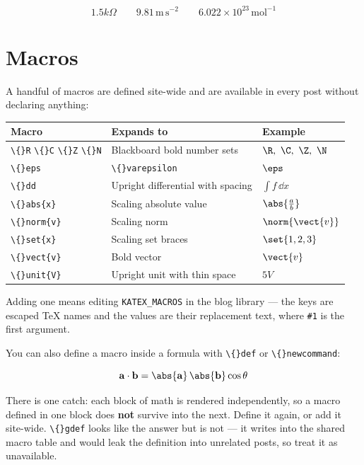 \[
1.5\unit{k\Omega} \qquad 9.81\,\mathrm{m\,s^{-2}} \qquad 6.022 \times 10^{23}\,\mathrm{mol^{-1}}
\]

\section{Macros}

A handful of macros are defined site-wide and are available in every post without declaring anything:

\begin{tabular}{lll}
\hline
Macro & Expands to & Example \\
\hline
\texttt{\textbackslash\{\}R} \texttt{\textbackslash\{\}C} \texttt{\textbackslash\{\}Z} \texttt{\textbackslash\{\}N} & Blackboard bold number sets & $\R,\ \C,\ \Z,\ \N$ \\
\texttt{\textbackslash\{\}eps} & \texttt{\textbackslash\{\}varepsilon} & $\eps$ \\
\texttt{\textbackslash\{\}dd} & Upright differential with spacing & $\int f\,\dd x$ \\
\texttt{\textbackslash\{\}abs\{x\}} & Scaling absolute value & $\abs{\frac{a}{b}}$ \\
\texttt{\textbackslash\{\}norm\{v\}} & Scaling norm & $\norm{\vect{v}}$ \\
\texttt{\textbackslash\{\}set\{x\}} & Scaling set braces & $\set{1, 2, 3}$ \\
\texttt{\textbackslash\{\}vect\{v\}} & Bold vector & $\vect{v}$ \\
\texttt{\textbackslash\{\}unit\{V\}} & Upright unit with thin space & $5\unit{V}$ \\
\hline
\end{tabular}

Adding one means editing \texttt{KATEX\_MACROS} in the blog library — the keys are escaped TeX names and the values are their replacement text, where \texttt{\#1} is the first argument.

You can also define a macro inside a formula with \texttt{\textbackslash\{\}def} or \texttt{\textbackslash\{\}newcommand}:

\[
\def\myvec#1{\mathbf{#1}}
\myvec{a} \cdot \myvec{b} = \abs{\myvec{a}}\,\abs{\myvec{b}}\cos\theta
\]

There is one catch: each block of math is rendered independently, so a macro defined in one block does \textbf{not} survive into the next. Define it again, or add it site-wide. \texttt{\textbackslash\{\}gdef} looks like the answer but is not — it writes into the shared macro table and would leak the definition into unrelated posts, so treat it as unavailable.

